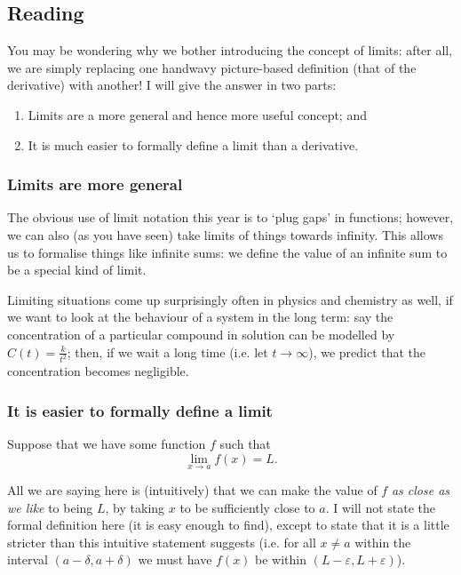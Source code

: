 


\subsection*{Reading}
You may be wondering why we bother introducing the concept of limits: after all, we are simply replacing one handwavy picture-based definition (that
of the derivative) with another! I will give the answer in two parts:
\begin{enumerate}
  \item Limits are a more general and hence more useful concept; and
  \item It is much easier to formally define a limit than a derivative.
\end{enumerate}

\subsubsection*{Limits are more general}
The obvious use of limit notation this year is to `plug gaps' in functions; however, we can also (as you have seen) take limits of things towards
infinity. This allows us to formalise things like infinite sums: we define the value of an infinite sum to be a special kind of limit.

Limiting situations come up surprisingly often in physics and chemistry as well, if we want to look at the behaviour of a system in the long term:
say the concentration of a particular compound in solution can be modelled by $ C(t) = \frac{k}{t^2} $; then, if we wait a long time (i.e. let $ t \to \infty $),
we predict that the concentration becomes negligible.

\subsubsection*{It is easier to formally define a limit}
Suppose that we have some function $ f $ such that
\begin{displaymath}
  \lim_{x \to a} f(x) = L.
\end{displaymath}

All we are saying here is (intuitively) that we can make the value of $ f $ \emph{as close as we like} to being $ L $, by taking $ x $ to be sufficiently close
to $ a $. I will not state the formal definition here (it is easy enough to find), except to state that it is a little stricter than this intuitive statement
suggests (i.e. for all $ x \neq a $ within the interval $ (a - \delta, a + \delta) $ we must have $ f(x) $ be within $ (L - \varepsilon, L + \varepsilon) $).

